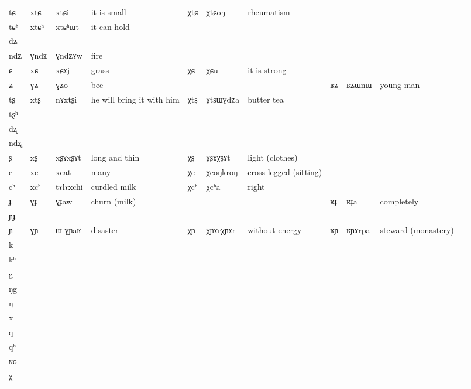 \documentclass[oldfontcommands,oneside,a4paper,11pt]{article}
\newcommand{\ipa}[1]{{\phon #1}} %
\newcommand{\tib}[1]{\cellcolor{lightgray}\textbf{#1}}
\newcommand{\idph}[1]{\cellcolor{gray}\textbf{#1}}
\begin{document}
\begin{table}
{\begin{tabular}{l|lll|lll|lll|l}
\ipa{tɕ}  & 	 \ipa{xtɕ}  & 	 \ipa{xtɕi}  & 	 it is small & 	 \ipa{χtɕ}  \tib{} & 	 \ipa{χtɕoŋ}  & 	rheumatism&&& \\  
\ipa{tɕʰ}  & 	 \ipa{xtɕʰ}  & 	 \ipa{xtɕʰɯt}  & 	it can hold  & 	  & 	  & 	&&& \\  
\ipa{dʑ}   & 	  & 	  & 	  & 	  & 	  & 	& 	  & 	  & 	 \\  
\ipa{ndʑ}  & 	 \ipa{ɣndʑ}  & 	 \ipa{ɣndʑɤw}  & 	fire  & 	  & 	  & &&&	 \\  
\ipa{ɕ}  & 	 \ipa{xɕ}  & 	 \ipa{xɕɤj}  & 	grass  & 	 \ipa{χɕ}  & 	 \ipa{χɕu}  & 	it is strong &&&\\  
\ipa{ʑ}  & 	 \ipa{ɣʑ}  & 	 \ipa{ɣʑo}  & 	bee  & 	&&& \ipa{ʁʑ}  &  	 \ipa{ʁʑɯnɯ}  & 	young man \\  
\ipa{tʂ}  & 	 \ipa{xtʂ}  & 	 \ipa{nɤxtʂi}  & 	 he will bring it with him & 	 \ipa{χtʂ}  \tib{}& 	 \ipa{χtʂɯɣdʑa}  & 	butter tea &&&\\  
\ipa{tʂʰ}  & 	  & 	  & 	  & 	  & 	  & &&&	 \\  
\ipa{dʐ}  & 	  & 	  & 	  & 	  & 	  & &&&	 \\  
\ipa{ndʐ}  & 	  & 	  & 	  & 	  & 	  & &&&	 \\  
\ipa{ʂ}  & 	 \ipa{xʂ} \idph{}  & 	 \ipa{xʂɤxʂɤt }  & 	long and thin  & 	 \ipa{χʂ} \idph{}  & 	 \ipa{χʂɤχʂɤt}  & 	light (clothes)&&& \\  
\ipa{c}  & 	 \ipa{xc}  & 	 \ipa{xcat}  & 	many  & 	 \ipa{χc} \tib{}  & 	 \ipa{χcoŋkroŋ}  & 	 cross-legged (sitting) &&&\\  
\ipa{cʰ}  & 	 \ipa{xcʰ}  & 	 \ipa{tɤlɤxchi}  & 	curdled milk  & 	 \ipa{χcʰ}  & 	 \ipa{χcʰa}  & 	 right &&&\\  
\ipa{ɟ}  & 	 \ipa{ɣɟ}  & 	 \ipa{ɣɟaw}  & 	 churn (milk) & &&&	 \ipa{ʁɟ}  & 	  \ipa{ʁɟa}  & 	completely  \\  
\ipa{ɲɟ}  & 	  & 	  & 	  & 	  & 	  & 	& 	  & 	  & 	 \\  
\ipa{ɲ}  & 	 \ipa{ɣɲ}  & 	 \ipa{ɯ-ɣɲaʁ}  & 	 disaster & 	\ipa{χɲ} \idph{}& \ipa{χɲɤrχɲɤr}& without energy & \ipa{ʁɲ}\tib{}  & 	 \ipa{ʁɲɤrpa}  & 	steward (monastery) \\  
\ipa{k}  & 	  & 	  & 	  & 	  & 	  & 	& 	  & 	  & 	 \\  
\ipa{kʰ}  & 	  & 	  & 	  & 	  & 	  & 	& 	  & 	  & 	 \\  
\ipa{g}   & 	  & 	  & 	  & 	  & 	  & 	& 	  & 	  & 	 \\  
\ipa{ŋg}   & 	  & 	  & 	  & 	  & 	  & 	& 	  & 	  & 	 \\  
\ipa{ŋ}  & 	  & 	  & 	  & 	  & 	  & 	& 	  & 	  & 	 \\  
\ipa{x}  & 	  & 	  & 	  & 	  & 	  & 	& 	  & 	  & 	 \\  
\ipa{q}   & 	  & 	  & 	  & 	  & 	  & 	& 	  & 	  & 	 \\  
\ipa{qʰ}   & 	  & 	  & 	  & 	  & 	  & 	& 	  & 	  & 	 \\  
\ipa{ɴɢ}   & 	  & 	  & 	  & 	  & 	  & 	& 	  & 	  & 	 \\  
\ipa{χ}   & 	  & 	  & 	  & 	  & 	  & 	& 	  & 	  & 	 \\  
\bottomrule
\end{tabular}}
\end{table}
\end{document}
